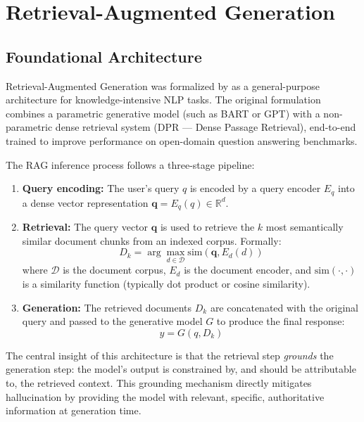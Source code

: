 \section{Retrieval-Augmented Generation}
\label{sec:bg-rag}

\subsection{Foundational Architecture}

Retrieval-Augmented Generation was formalized by \citet{Lewis2020} as a general-purpose architecture for knowledge-intensive NLP tasks. The original formulation combines a parametric generative model (such as BART or GPT) with a non-parametric dense retrieval system (DPR — Dense Passage Retrieval), end-to-end trained to improve performance on open-domain question answering benchmarks.

The RAG inference process follows a three-stage pipeline:

\begin{enumerate}
  \item \textbf{Query encoding:} The user's query $q$ is encoded by a query encoder $E_q$ into a dense vector representation $\mathbf{q} = E_q(q) \in \mathbb{R}^d$.

  \item \textbf{Retrieval:} The query vector $\mathbf{q}$ is used to retrieve the $k$ most semantically similar document chunks from an indexed corpus. Formally:
  \begin{equation}
    D_k = \arg\max_{d \in \mathcal{D}} \text{sim}(\mathbf{q}, E_d(d))
    \label{eq:retrieval}
  \end{equation}
  where $\mathcal{D}$ is the document corpus, $E_d$ is the document encoder, and $\text{sim}(\cdot, \cdot)$ is a similarity function (typically dot product or cosine similarity).

  \item \textbf{Generation:} The retrieved documents $D_k$ are concatenated with the original query and passed to the generative model $G$ to produce the final response:
  \begin{equation}
    y = G(q, D_k)
    \label{eq:generation}
  \end{equation}
\end{enumerate}

The central insight of this architecture is that the retrieval step \textit{grounds} the generation step: the model's output is constrained by, and should be attributable to, the retrieved context. This grounding mechanism directly mitigates hallucination by providing the model with relevant, specific, authoritative information at generation time.

